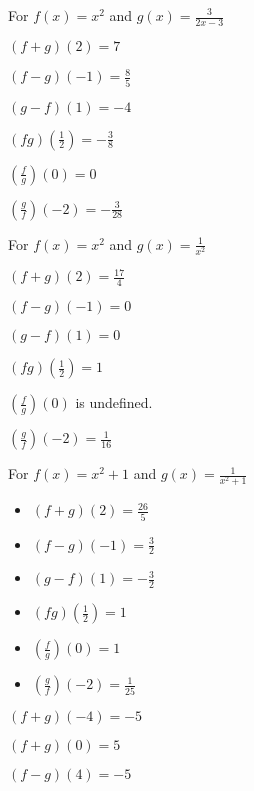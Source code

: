 \begin{exenum}
\item For  $f(x) = x^2$ and $g(x) = \frac{3}{2x-3}$

\begin{shortitemize}[MMMMMMMMMMM]
\item  $(f+g)(2) = 7$
\item  $(f-g)(-1) = \frac{8}{5}$
\item  $(g-f)(1) = -4$
\item  $(fg)\left(\frac{1}{2}\right) = -\frac{3}{8}$
\item  $\left(\frac{f}{g}\right)(0) = 0$
\item  $\left(\frac{g}{f}\right)\left(-2\right) = -\frac{3}{28}$
\end{shortitemize}

\item For  $f(x) = x^2$ and $g(x) = \frac{1}{x^2}$

\begin{shortitemize}[MMMMMMMMMMMM]
\item  $(f+g)(2) =\frac{17}{4}$
\item  $(f-g)(-1) = 0$
\item  $(g-f)(1) = 0$
\item  $(fg)\left(\frac{1}{2}\right) =1$
\item  $\left(\frac{f}{g}\right)(0)$ is undefined.
\item  $\left(\frac{g}{f}\right)\left(-2\right) = \frac{1}{16}$
\end{shortitemize}

\item For  $f(x) = x^2+1$ and $g(x) = \frac{1}{x^2+1}$

\begin{itemize}

\item  $(f+g)(2) =\frac{26}{5}$
\item  $(f-g)(-1) = \frac{3}{2}$
\item  $(g-f)(1) = -\frac{3}{2}$

\item  $(fg)\left(\frac{1}{2}\right) =1$
\item  $\left(\frac{f}{g}\right)(0) = 1$
\item  $\left(\frac{g}{f}\right)\left(-2\right) = \frac{1}{25}$

\end{itemize}

\item $(f + g)(-4) = -5$   
\item $(f + g)(0) = 5$
\item $(f-g)(4) = -5$


\end{exenum}
